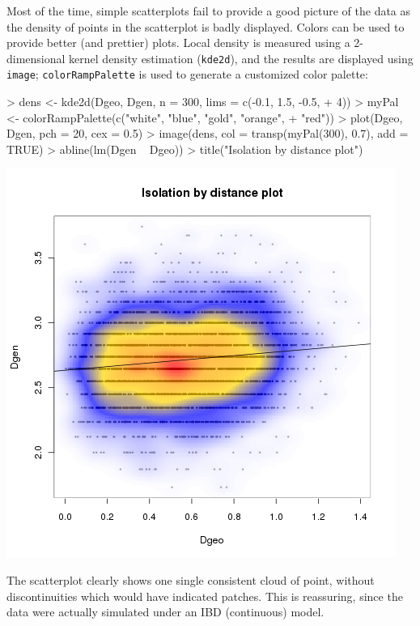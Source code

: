 \documentclass{article}
\begin{document}
\noindent Most of the time, simple scatterplots fail to provide a good picture of the data as the
density of points in the scatterplot is badly displayed.
Colors can be used to provide better (and prettier) plots.
Local density is measured using a 2-dimensional kernel density estimation (\texttt{kde2d}), and the
results are displayed using \texttt{image}; \texttt{colorRampPalette} is used to generate a
customized color palette:
\begin{Schunk}
\begin{Sinput}
> dens <- kde2d(Dgeo, Dgen, n = 300, lims = c(-0.1, 1.5, -0.5, 
+     4))
> myPal <- colorRampPalette(c("white", "blue", "gold", "orange", 
+     "red"))
> plot(Dgeo, Dgen, pch = 20, cex = 0.5)
> image(dens, col = transp(myPal(300), 0.7), add = TRUE)
> abline(lm(Dgen ~ Dgeo))
> title("Isolation by distance plot")
\end{Sinput}
\end{Schunk}
\begin{center}
\includegraphics{figs/densIbd}
\end{center}

The scatterplot clearly shows one single consistent cloud of point, without discontinuities which
would have indicated patches.
This is reassuring, since the data were actually simulated under an IBD (continuous) model.
\end{document}

